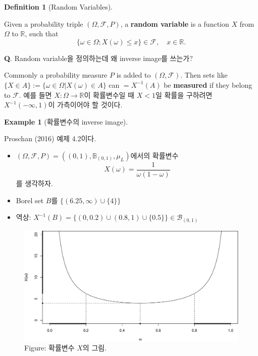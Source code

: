 \documentclass[
  letterpaper,
  DIV=11,
  numbers=noendperiod]{scrreprt}
\theoremstyle{definition}
\theoremstyle{plain}
\theoremstyle{plain}
\theoremstyle{definition}
\newtheorem{example}{Example}[chapter]
\theoremstyle{plain}
\theoremstyle{definition}
\newtheorem{definition}{Definition}[chapter]
\theoremstyle{remark}
\begin{document}
\begin{definition}[Random
Variables]\protect\hypertarget{def-rvs}{}\label{def-rvs}

Given a probability triple \((\Omega, \mathcal{F}, P)\), a
\textbf{random variable} is a function \(X\) from \(\Omega\) to
\(\mathbb{R}\), such that \[
\{ \omega \in \Omega; X(\omega) \leq x  \} \in \mathcal{F} ,\quad{} x \in \mathbb{R}.
\]

\end{definition}

\textbf{Q}. Random variable을 정의하는데 왜 inverse image를 쓰는가?

Commonly a probability measure \(P\) is added to
\((\Omega, \mathcal{F})\). Then sets like
\(\{X \in A\}:= \{\omega \in \Omega | X(\omega) \in A\}\) can
\(=X^{-1}(A)\) be \textbf{measured} if they belong to \(\mathcal{F}\).
예를 들면 \(X: \Omega \rightarrow \mathbb{R}\)이 확률변수일 때 \(X<1\)일
확률을 구하려면 \(X^{-1}(-\infty, 1)\)이 가측이어야 할 것이다.

\begin{example}[확률변수의 inverse
image]\protect\hypertarget{exm-rvs}{}\label{exm-rvs}

Proschan (2016) 예제 4.2이다.

\begin{itemize}
\item
  \((\Omega, \mathcal{F}, P) = ((0,1),\mathbb{B}_{(0,1)}, \mu_L)\)에서의
  확률변수 \[
  X(\omega) = \frac{1}{\omega (1-\omega)}
  \] 를 생각하자.
\item
  Borel set \(B\)를 \(\{ (6.25, \infty) \cup \{4\}\}\)
\item
  역상:
  \(X^{-1}(B) = \{ (0,0.2) \cup (0.8,1) \cup \{0.5\} \} \in \mathcal{B}_{(0,1)}\)
\end{itemize}

\begin{figure}[H]

{\centering \includegraphics[width=0.7\linewidth,height=\textheight,keepaspectratio]{rvs_files/figure-pdf/unnamed-chunk-2-1.pdf}

}

\caption{Figure: 확률변수 \(X\)의 그림.}

\end{figure}%

\end{example}
\end{document}
